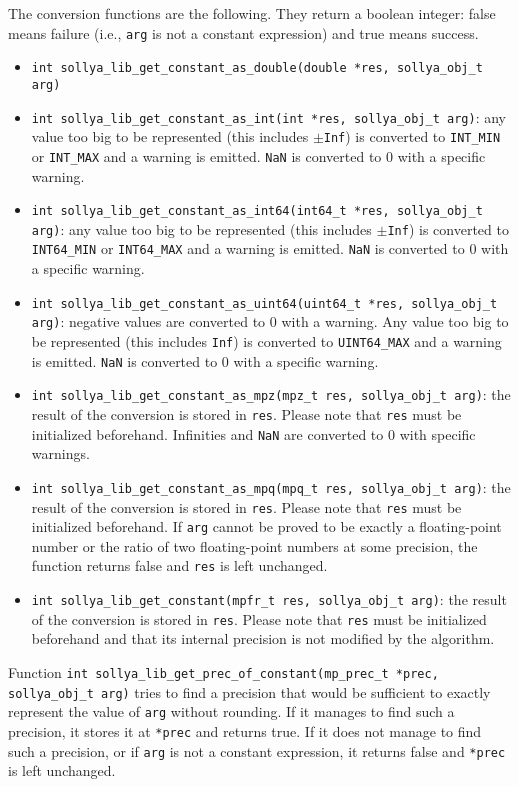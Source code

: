 \documentclass[a4paper]{article}
\begin{document}
The conversion functions are the following. They return a boolean integer: false means failure (i.e., \verb|arg| is not a constant expression) and true means success.
\begin{itemize}
\item \verb|int sollya_lib_get_constant_as_double(double *res, sollya_obj_t arg)|
\item \verb|int sollya_lib_get_constant_as_int(int *res, sollya_obj_t arg)|: any value too big to be represented (this includes $\pm$\verb|Inf|) is converted to \verb|INT_MIN| or \verb|INT_MAX| and a warning is emitted. \verb|NaN| is converted to $0$ with a specific warning.
\item \verb|int sollya_lib_get_constant_as_int64(int64_t *res, sollya_obj_t arg)|: any value too big to be represented (this includes $\pm$\verb|Inf|) is converted to \verb|INT64_MIN| or \verb|INT64_MAX| and a warning is emitted. \verb|NaN| is converted to $0$ with a specific warning.
\item \verb|int sollya_lib_get_constant_as_uint64(uint64_t *res, sollya_obj_t arg)|: negative values are converted to $0$ with a warning. Any value too big to be represented (this includes \verb|Inf|) is converted to \verb|UINT64_MAX| and a warning is emitted. \verb|NaN| is converted to $0$ with a specific warning.
\item \verb|int sollya_lib_get_constant_as_mpz(mpz_t res, sollya_obj_t arg)|: the result of the conversion is stored in \verb|res|. Please note that \verb|res| must be initialized beforehand. Infinities and \verb|NaN| are converted to $0$ with specific warnings.
\item \verb|int sollya_lib_get_constant_as_mpq(mpq_t res, sollya_obj_t arg)|: the result of the conversion is stored in \verb|res|. Please note that \verb|res| must be initialized beforehand. If \verb|arg| cannot be proved to be exactly a floating-point number or the ratio of two floating-point numbers at some precision, the function returns false and \verb|res| is left unchanged.
\item \verb|int sollya_lib_get_constant(mpfr_t res, sollya_obj_t arg)|: the result of the conversion is stored in \verb|res|. Please note that \verb|res| must be initialized beforehand and that its internal precision is not modified by the algorithm.
\end{itemize}

Function  \verb|int sollya_lib_get_prec_of_constant(mp_prec_t *prec, sollya_obj_t arg)| tries to find a precision that would be sufficient to exactly represent the value of \verb|arg| without rounding. If it manages to find such a precision, it stores it at \verb|*prec| and returns true. If it does not manage to find such a precision, or if \verb|arg| is not a constant expression, it returns false and \verb|*prec| is left unchanged.
\end{document}
